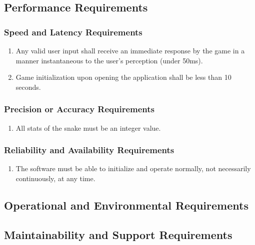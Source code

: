 \documentclass[12pt, titlepage]{article}
\begin{document}
\subsection{Performance Requirements}


\subsubsection{Speed and Latency Requirements}
\label{ssub:speed_and_latency_requirements}
\begin{enumerate}[{PR}1. ]
	\item Any valid user input shall receive an immediate response by the game in a manner instantaneous to the user’s perception (under 50ms).
	\item Game initialization upon opening the application shall be less than 10 seconds.
\end{enumerate}

\subsubsection{Precision or Accuracy Requirements}
\label{ssub:precision_or_accuracy_requirements}
\begin{enumerate}[{PR}1. ]
	\item All stats of the snake must be an integer value.
\end{enumerate}

\subsubsection{Reliability and Availability Requirements}
\label{ssub:reliability_and_availability_requirements}
\begin{enumerate}[{PR}1. ]
	\item The software must be able to initialize and operate normally, not necessarily continuously, at any time.
\end{enumerate}



\subsection{Operational and Environmental Requirements}



\subsection{Maintainability and Support Requirements}
\label{sub:maintainability_and_support_requirements}
\end{document}
